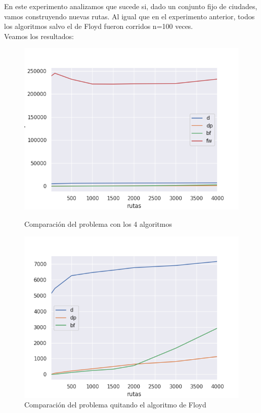 En este experimento analizamos que sucede si, dado un conjunto fijo de ciudades, vamos construyendo nuevas rutas. Al igual que en el experimento anterior, todos los algoritmos salvo el de Floyd fueron corridos n=100 veces. \\
Veamos los resultados:
\begin{figure}[H]
   \begin{minipage}{0.5\textwidth}
     \centering
     \includegraphics[width=1\linewidth]{img/exp2_2.png}
     \caption{Comparación del problema con los 4 algoritmos}
   \end{minipage}\hfill
   \begin{minipage}{0.5\textwidth}
     \centering
     \includegraphics[width=1\linewidth]{img/exp2_1.png}
     \caption{Comparación del problema quitando el algoritmo de Floyd}
   \end{minipage}
\end{figure}

